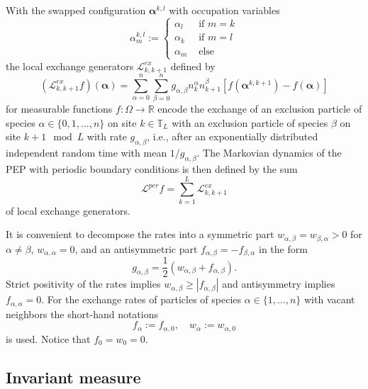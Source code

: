 \documentclass[12pt]{article}
\newcommand{\bel}[1]{\begin{equation}\label{#1}}
\newcommand{\ee}{\end{equation}}
\newcommand{\ba}{\begin{array}}
\newcommand{\ea}{\end{array}}
\newcommand{\R}{{\mathbb R}}
\newcommand{\T}{{\mathbb T}} %
\newcommand{\balpha}{\boldsymbol{\alpha}}
\begin{document}
With the swapped configuration
$\balpha^{k,l}$ with occupation variables
\begin{equation}
\alpha^{k,l}_m := \left\{\ba{cc} 
\alpha_{l} & \mbox{ if } m=k \\
\alpha_{k} & \mbox{ if } m=l \\
\alpha_{m} & \mbox{ else } 
\ea\right.
\end{equation}
the local exchange generators $\mathcal{L}^{ex}_{k,k+1}$ defined by
\begin{equation}
(\mathcal{L}^{ex}_{k,k+1} f) (\balpha) = 
\sum_{\alpha=0}^n \sum_{\beta=0}^n 
g_{\alpha, \beta} n^{\alpha}_{k} n^{\beta}_{k+1}
\left[f(\balpha^{k,k+1}) - f(\balpha)\right] 
\label{genPEPloc}
\end{equation}
for measurable functions $f:\Omega\to\R$
encode the exchange of
an exclusion particle of species
$\alpha \in \{0,1,\dots,n\}$ on site $k\in\T_L$ with an 
exclusion particle of species
$\beta$ on site $k+1 \mod{L}$ with rate $g_{\alpha,\beta}$,
i.e., after an exponentially distributed independent random time with
mean $1/g_{\alpha,\beta}$. 
The Markovian dynamics of the PEP with periodic boundary conditions 
is then defined by the sum
\begin{equation}
\mathcal{L}^{per} f = \sum_{k=1}^{L} \mathcal{L}^{ex}_{k,k+1} 
\label{genPEP}
\end{equation}
of local exchange  generators.

It is convenient to decompose the rates into a symmetric part 
$w_{\alpha,\beta}=w_{\beta,\alpha}>0$ for $\alpha\neq\beta$, 
$w_{\alpha,\alpha}=0$, 
and an antisymmetric part $f_{\alpha,\beta}=-f_{\beta,\alpha}$ 
in the form
\bel{rates}
g_{\alpha, \beta} = \frac{1}{2} (w_{\alpha, \beta} + f_{\alpha,\beta}) .
\ee
Strict positivity of the rates implies $w_{\alpha,\beta} \geq |f_{\alpha,\beta}|$ and antisymmetry implies  
$f_{\alpha,\alpha} = 0$. For the exchange rates of particles of 
species
$\alpha\in\{1,\dots,n\}$ with vacant neighbors the short-hand
notations
\bel{Edef}
f_\alpha := f_{\alpha,0}, \quad w_\alpha := w_{\alpha,0}
\ee
is used. Notice that $f_{0}=w_{0}=0$. 

\subsection{Invariant measure}
\end{document}
